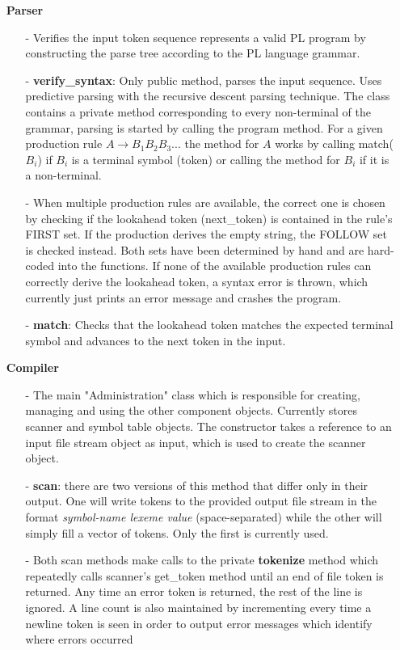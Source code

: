 \documentclass{article}
\begin{document}
\begin{itemize}
        \item[]\textbf{Parser}
            \begin{itemize}
                \item[-] Verifies the input token sequence represents a valid PL program by constructing the parse tree according to the PL language grammar.
                \item[-] \textbf{verify\_syntax}: Only public method, parses the input sequence. Uses predictive parsing with the recursive descent parsing technique. The class contains a private method corresponding to every non-terminal of the grammar, parsing is started by calling the program method. For a given production rule $A \longrightarrow B_1B_2B_3...$ the method for $A$ works by calling match($B_i$) if $B_i$ is a terminal symbol (token) or calling the method for $B_i$ if it is a non-terminal.
                \item[-] When multiple production rules are available, the correct one is chosen by checking if the lookahead token (next\_token) is contained in the rule's FIRST set. If the production derives the empty string, the FOLLOW set is checked instead. Both sets have been determined by hand and are hard-coded into the functions. If none of the available production rules can correctly derive the lookahead token, a syntax error is thrown, which currently just prints an error message and crashes the program.
                \item[-] \textbf{match}: Checks that the lookahead token matches the expected terminal symbol and advances to the next token in the input.
            \end{itemize}

        \item[]\textbf{Compiler}
            \begin{itemize}
                \item[-] The main "Administration" class which is responsible for creating, managing and using the other component objects. Currently stores scanner and symbol table objects. The constructor takes a reference to an input file stream object as input, which is used to create the scanner object. 
                \item[-] \textbf{scan}: there are two versions of this method that differ only in their output. One will write tokens to the provided output file stream in the format \textit{symbol-name lexeme value} (space-separated) while the other will simply fill a vector of tokens. Only the first is currently used.  
                \item[-] Both scan methods make calls to the private \textbf{tokenize} method which repeatedly calls scanner's get\_token method until an end of file token is returned. Any time an error token is returned, the rest of the line is ignored. A line count is also maintained by incrementing every time a newline token is seen in order to output error messages which identify where errors occurred
            \end{itemize}

    \end{itemize}
\end{document}
